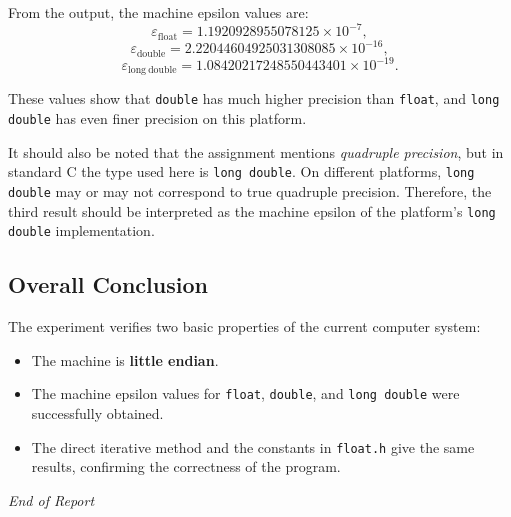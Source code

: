 \documentclass[12pt,a4paper]{article}
\begin{document}
From the output, the machine epsilon values are:
\[
\varepsilon_{\mathrm{float}} = 1.1920928955078125 \times 10^{-7},
\]
\[
\varepsilon_{\mathrm{double}} = 2.22044604925031308085 \times 10^{-16},
\]
\[
\varepsilon_{\mathrm{long\ double}} = 1.08420217248550443401 \times 10^{-19}.
\]

These values show that \texttt{double} has much higher precision than \texttt{float}, and \texttt{long double} has even finer precision on this platform.

It should also be noted that the assignment mentions \emph{quadruple precision}, but in standard C the type used here is \texttt{long double}. On different platforms, \texttt{long double} may or may not correspond to true quadruple precision. Therefore, the third result should be interpreted as the machine epsilon of the platform's \texttt{long double} implementation.

\subsection*{Overall Conclusion}

The experiment verifies two basic properties of the current computer system:
\begin{itemize}
    \item The machine is \textbf{little endian}.
    \item The machine epsilon values for \texttt{float}, \texttt{double}, and \texttt{long double} were successfully obtained.
    \item The direct iterative method and the constants in \texttt{float.h} give the same results, confirming the correctness of the program.
\end{itemize}

\vfill
\begin{center}
    \textit{End of Report}
\end{center}
\end{document}

